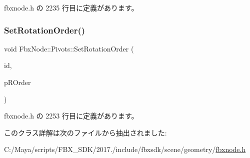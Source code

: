  fbxnode.\+h の 2235 行目に定義があります。

\mbox{\label{class_fbx_node_1_1_pivots_a7f0f5d29498e70ed840a70c16cff355d}} 
\subsubsection{\texorpdfstring{Set\+Rotation\+Order()}{SetRotationOrder()}}
{\footnotesize\ttfamily void Fbx\+Node\+::\+Pivots\+::\+Set\+Rotation\+Order (\begin{DoxyParamCaption}\item[{int}]{id,  }\item[{\hyperlink{fbxmath_8h_ae46778666b56bb0abe5992b855fe9332}{E\+Fbx\+Rotation\+Order}}]{p\+R\+Order }\end{DoxyParamCaption})\hspace{0.3cm}{\ttfamily [inline]}}



 fbxnode.\+h の 2253 行目に定義があります。



このクラス詳解は次のファイルから抽出されました\+:\begin{DoxyCompactItemize}
\item 
C\+:/\+Maya/scripts/\+F\+B\+X\+\_\+\+S\+D\+K/2017./include/fbxsdk/scene/geometry/\hyperlink{fbxnode_8h}{fbxnode.\+h}\end{DoxyCompactItemize}
